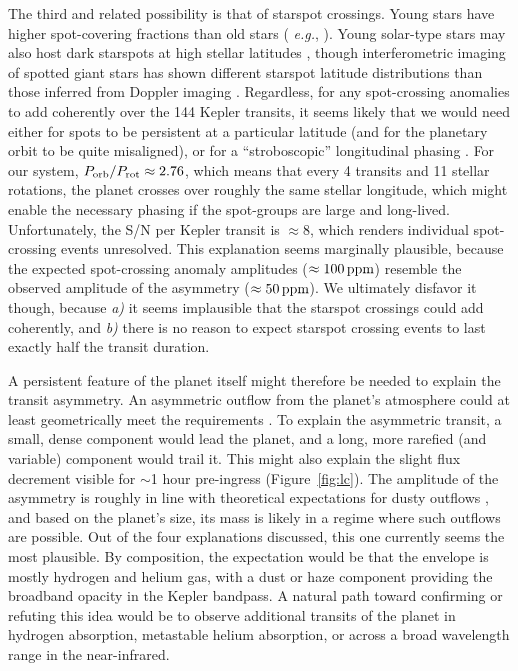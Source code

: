 \documentclass[12pt,modern,twocolumn,tighten]{aastex63}
\begin{document}
The third and related possibility is that of starspot crossings.
Young stars have higher spot-covering fractions than old stars ({\it
e.g.}, \citealt{morris_relationship_2020}).  Young solar-type stars
may also host dark starspots at high stellar latitudes \citep[{\it
e.g.}, EK~Dra;][]{strassmeier_starspots_2009}, though interferometric
imaging of spotted giant stars has shown different starspot latitude
distributions than those inferred from Doppler imaging
\citep{roettenbacher_contemporaneous_2017}.  Regardless, for any
spot-crossing anomalies to add coherently over the 144 Kepler
transits, it seems likely that we would need either for spots to be
persistent at a particular latitude (and for the planetary orbit to be
quite misaligned), or for a ``stroboscopic'' longitudinal phasing
\citep[{\it e.g.},][]{dai_stellar_2018}.  For our system, $P_{\rm
orb}/P_{\rm rot} \approx 2.76$, which means that every 4 transits and
11 stellar rotations, the planet crosses over roughly the same stellar
longitude, which might enable the necessary phasing if the spot-groups
are large and long-lived.  Unfortunately, the  S/N per Kepler transit
is $\approx8$, which renders individual spot-crossing events
unresolved.  This explanation seems marginally plausible, because the
expected spot-crossing anomaly amplitudes ($\approx 100\,{\rm ppm}$)
resemble the observed amplitude of the asymmetry ($\approx 50\,{\rm
ppm}$).  We ultimately disfavor it though, because {\it a)} it seems
implausible that the starspot crossings could add coherently, and {\it
b)} there is no reason to expect starspot crossing events to last
exactly half the transit duration.

A persistent feature of the planet itself might therefore be needed to
explain the transit asymmetry.  An asymmetric outflow from the
planet's atmosphere could at least geometrically meet the requirements
\citep[{\it e.g.},][]{mccann_2019}.  To explain the asymmetric
transit, a small, dense component would lead the planet, and a long,
more rarefied (and variable) component would trail it.  This might
also explain the slight flux decrement visible for $\sim$1 hour
pre-ingress (Figure~\ref{fig:lc}).  The amplitude of the asymmetry is
roughly in line with theoretical expectations for dusty outflows
\citep{wang_dai_2019}, and based on the planet's size, its mass is
likely in a regime where such outflows are possible.  Out of the four
explanations discussed, this one currently seems the most plausible.
By composition, the expectation would be that the envelope is mostly
hydrogen and helium gas, with a dust or haze component providing the
broadband opacity in the Kepler bandpass.  A natural path
toward confirming or refuting this idea would be to observe additional
transits of the planet in hydrogen absorption, 
metastable helium absorption, or across a broad wavelength range in
the near-infrared.
\end{document}
